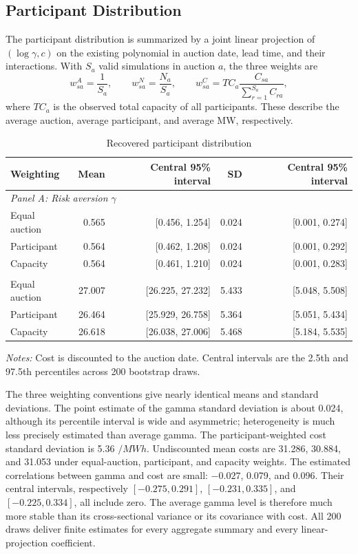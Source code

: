 \documentclass[10pt]{article}
\begin{document}
\subsection{Participant Distribution}

The participant distribution is summarized by a joint linear projection of
$(\log\gamma,c)$ on the existing polynomial in auction date, lead time, and
their interactions. With $S_a$ valid simulations in auction $a$, the three
weights are
\[
w^A_{sa}=\frac{1}{S_a},
\qquad
w^N_{sa}=\frac{N_a}{S_a},
\qquad
w^C_{sa}=TC_a\frac{C_{sa}}{\sum_{r=1}^{S_a}C_{ra}},
\]
where $TC_a$ is the observed total capacity of all participants. These
describe the average auction, average participant, and average MW,
respectively.

\begin{table}[H]
\centering
\small
\caption{Recovered participant distribution}
\label{tab:participant_results}
\begin{tabular}{lrrrr}
\toprule
Weighting & Mean & Central 95\% interval & SD & Central 95\% interval\\
\midrule
\multicolumn{5}{l}{\textit{Panel A: Risk aversion $\gamma$}}\\
Equal auction & 0.565 & [0.456, 1.254] & 0.024 & [0.001, 0.274]\\
Participant & 0.564 & [0.462, 1.208] & 0.024 & [0.001, 0.292]\\
Capacity & 0.564 & [0.461, 1.210] & 0.024 & [0.001, 0.283]\\
\addlinespace
\multicolumn{5}{l}{\textit{Panel B: Cost}}\\
Equal auction & 27.007 & [26.225, 27.232] & 5.433 & [5.048, 5.508]\\
Participant & 26.464 & [25.929, 26.758] & 5.364 & [5.051, 5.434]\\
Capacity & 26.618 & [26.038, 27.006] & 5.468 & [5.184, 5.535]\\
\bottomrule
\end{tabular}
\begin{minipage}{0.92\textwidth}
\footnotesize
\textit{Notes:} Cost is discounted to the auction date. Central intervals are
the 2.5th and 97.5th percentiles across 200 bootstrap draws.
\end{minipage}
\end{table}

The three weighting conventions give nearly identical means and standard
deviations. The point estimate of the gamma standard deviation is about 0.024,
although its percentile interval is wide and asymmetric; heterogeneity is much
less precisely estimated than average gamma. The participant-weighted cost
standard deviation is 5.36 $/MWh$.
Undiscounted mean costs are 31.286, 30.884, and 31.053 under equal-auction,
participant, and capacity weights. The estimated correlations between gamma
and cost are small: $-0.027$, 0.079, and 0.096. Their central intervals,
respectively $[-0.275,0.291]$, $[-0.231,0.335]$, and $[-0.225,0.334]$, all
include zero. The average gamma level is therefore much more stable than its
cross-sectional variance or its covariance with cost. All 200 draws deliver
finite estimates for every aggregate summary and every linear-projection
coefficient.
\end{document}
